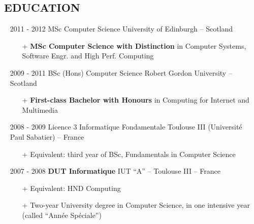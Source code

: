 \documentclass{res}
\begin{document}
  
\ifisanon
        \address{Some parts were removed. These are highlighted by \textit{(Anonymous)}}
\else

        \address{ \faMapMarker*~Digital Nomad, no permanent address ~~ \faPassport~France \\ \faAt~samuel@giffard.co ~~ \faMobile*~+32 (0) 4-84-14-10-33 ~~ \faMobile*~+33 (0) 7-69-69-12-02 \\ \\ \textbf{\faPython~Python Trainer, Engineer \& Evangelist} }
\fi

\begin{resume}
 
\section{\faGraduationCap~EDUCATION}
\begin{itemize} 
\item[] 2011 - 2012 \tabto{2cm} MSc Computer Science \hfill University of Edinburgh -- Scotland 
        \begin{itemize}
                \item[+] \textbf{MSc Computer Science with Distinction} in Computer Systems, Software Engr. and High Perf. Computing
        \end{itemize}
        
\item[] 2009 - 2011 \tabto{2cm} BSc (Hons) Computer Science \hfill Robert Gordon University -- Scotland 
        \begin{itemize}
                \item[+] \textbf{First-class Bachelor with Honours} in Computing for Internet and Multimedia
        \end{itemize}
        
\item[] 2008 - 2009 \tabto{2cm} Licence 3 Informatique Fondamentale \hfill Toulouse III (Universit\'e Paul Sabatier) -- France
        \begin{itemize}
                \item[+] Equivalent: third year of BSc, Fundamentals in Computer Science
        \end{itemize}

\item[] 2007 - 2008 \tabto{2cm} \textbf{DUT Informatique} \hfill IUT ``A'' -- Toulouse III -- France
        \begin{itemize}
                \item[+] Equivalent: HND Computing
                \item[+] Two-year University degree in Computer Science, in one intensive year (called ``Ann\'ee Sp\'eciale'')
        \end{itemize}


\end{itemize}
\end{resume}
\end{document}
